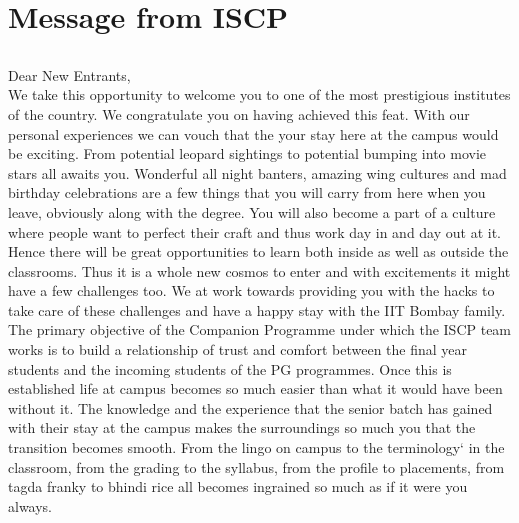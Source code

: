 \documentclass[openany]{book} %
\begin{document}
\chapter{Message from ISCP}

\section*{}

Dear New Entrants,\\
We take this opportunity to welcome you to one of the most prestigious institutes of the country. We
congratulate you on having achieved this feat. With our personal experiences we can vouch that the your stay
here at the campus would be exciting. From potential leopard sightings to potential bumping into movie stars
all awaits you. Wonderful all night banters, amazing wing cultures and mad birthday celebrations are a few
things that you will carry from here when you leave, obviously along with the degree. You will also become a
part of a culture where people want to perfect their craft and thus work day in and day out at it. Hence there will
be great opportunities to learn both inside as well as outside the classrooms. Thus it is a whole new cosmos to
enter and with excitements it might have a few challenges too. We at \href{https://gymkhana.iitb.ac.in/~scp/scp/index.html}{\color{blue}{Institute Students Companion Program (ISCP)}}  work towards providing you with the hacks to take care of these challenges and have a happy stay with the IIT Bombay family.\\
The primary objective of the Companion Programme under which the ISCP team works is to build a
relationship of trust and comfort between the final year students and the incoming students of the PG
programmes. Once this is established life at campus becomes so much easier than what it would have been
without it. The knowledge and the experience that the senior batch has gained with their stay at the campus
makes the surroundings so much you that the transition becomes smooth. From the lingo on campus to the
terminology` in the classroom, from the grading to the syllabus, from the profile to placements, from tagda
franky to bhindi rice all becomes ingrained so much as if it were you always.\\ 
\end{document}
